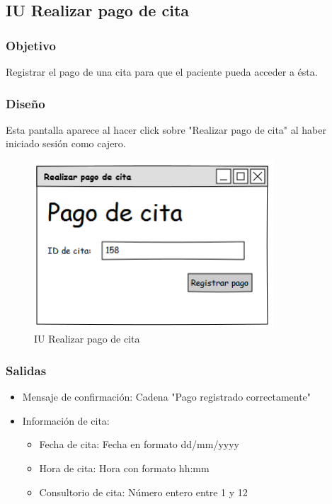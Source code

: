 \subsection{IU Realizar pago de cita}

\subsubsection{Objetivo}
Registrar el pago de una cita para que el paciente pueda acceder a ésta.

\subsubsection{Diseño}
Esta pantalla aparece al hacer click sobre "Realizar pago de cita" al haber iniciado sesión como cajero.

\begin{figure}[htbp!]
	\centering
	\includegraphics[width=0.8\textwidth]{images/IU_pagar_cita}
	\caption{IU Realizar pago de cita}
\end{figure}


\subsubsection{Salidas}
\begin{itemize} 
	\item Mensaje de confirmación: Cadena "Pago registrado correctamente"
	\item Información de cita:
	\begin{itemize}
		\item Fecha de cita: Fecha en formato dd/mm/yyyy
		\item Hora de cita: Hora con formato hh:mm
		\item Consultorio de cita: Número entero entre 1 y 12
	\end{itemize}
\end{itemize}
